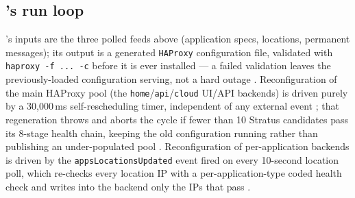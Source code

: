\subsection{\FDM's run loop}
\label{sec:networking-runloop}

\FDM's inputs are the three polled feeds above (application specs, locations, permanent
messages); its output is a generated \texttt{HAProxy} configuration file, validated with
\texttt{haproxy -\allowbreak{}f .\allowbreak{}.\allowbreak{}.\allowbreak{} -\allowbreak{}c} before it is ever installed — a failed validation leaves the
previously-loaded configuration serving, not a hard outage
. Reconfiguration of the
main HAProxy pool (the \texttt{home}\slash\texttt{api}\slash\texttt{cloud} UI/API backends) is driven purely
by a 30{,}000\,ms self-rescheduling timer, independent of any external event
; that regeneration throws and
aborts the cycle if fewer than 10 Stratus candidates pass its 8-stage health chain, keeping the
old configuration running rather than publishing an under-populated pool
. Reconfiguration of
per-application backends is driven by the \texttt{apps\allowbreak{}Locations\allowbreak{}Updated} event fired on every
10-second location poll, which re-checks every location IP with a per-application-type coded
health check and writes into the backend only the IPs that pass
. \shipped

